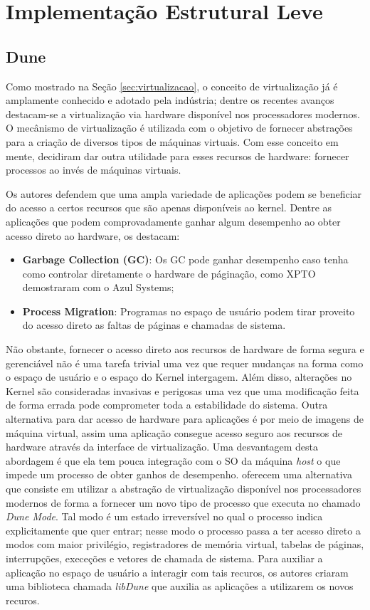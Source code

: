 \section{Implementação Estrutural Leve}

\subsection{Dune}

Como mostrado na Seção \ref{sec:virtualizacao},  o conceito de virtualização já
é amplamente conhecido e adotado pela indústria; dentre os recentes avanços
destacam-se a virtualização via hardware disponível nos processadores modernos.
O mecânismo de virtualização é utilizada com o objetivo de fornecer abstrações
para a criação de diversos tipos de máquinas virtuais. Com esse conceito em
mente, \citep{belay} decidiram dar outra utilidade para esses recursos de
hardware: fornecer processos ao invés de máquinas virtuais.

Os autores defendem que uma ampla variedade de aplicações podem se beneficiar
do acesso a certos recursos que são apenas disponíveis ao kernel. Dentre as
aplicações que podem comprovadamente ganhar algum desempenho ao obter acesso
direto ao hardware, os destacam:

\begin{itemize}
  \item \textbf{Garbage Collection (GC)}: Os GC pode ganhar desempenho caso
        tenha como controlar diretamente o hardware de páginação, como XPTO
        demostraram com o Azul Systems;
  \item \textbf{Process Migration}: Programas no espaço de usuário podem tirar
        proveito do acesso direto as faltas de páginas e chamadas de sistema.
\end{itemize}

Não obstante, fornecer o acesso direto aos recursos de hardware de forma segura
e gerenciável não é uma tarefa trivial uma vez que requer mudanças na forma
como o espaço de usuário e o espaço do Kernel intergagem. Além disso,
alterações no Kernel são consideradas invasivas e perigosas uma vez que uma
modificação feita de forma errada pode comprometer toda a estabilidade do
sistema. Outra alternativa para dar acesso de hardware para aplicações é por
meio de imagens de máquina virtual, assim uma aplicação consegue acesso seguro
aos recursos de hardware através da interface de virtualização. Uma desvantagem
desta abordagem é que ela tem pouca integração com o SO da máquina \emph{host}
o que impede um processo de obter ganhos de desempenho.  \citep{belay} oferecem
uma alternativa que consiste em utilizar a abstração de virtualização
disponível nos processadores modernos de forma a fornecer um novo tipo de
processo que executa no chamado \emph{Dune Mode}. Tal modo é um estado
irreversível no qual o processo indica explicitamente que quer entrar; nesse
modo o processo passa a ter acesso direto a modos com maior privilégio,
registradores de memória virtual, tabelas de páginas, interrupções, execeções e
vetores de chamada de sistema. Para auxiliar a aplicação no espaço de usuário a
interagir com tais recuros, os autores criaram uma biblioteca chamada
\emph{libDune} que auxilia as aplicações a utilizarem os novos recuros.

